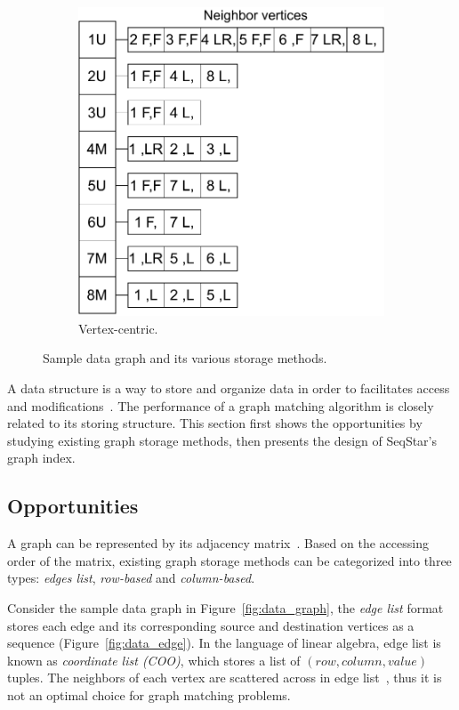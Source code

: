 \begin{figure}
\begin{minipage}[b]{0.68\textwidth}
\begin{subfigure}[b]{0.3\textwidth}
      \includegraphics[scale=0.3]{img/data_vertex_centric}
      \caption{Vertex-centric.}\label{fig:data_vertex_centric}
    \end{subfigure}
  \end{minipage}
  \caption{Sample data graph and its various storage methods.}\label{img:data}
\end{figure}
A data structure is a way to store and organize data in order to facilitates access and modifications~\cite{DBLP:books/daglib/0023376}.
The performance of a graph matching algorithm is closely related to its storing structure.
This section first shows the opportunities by studying existing graph storage methods,
then presents the design of SeqStar's graph index.

\subsection{Opportunities}
A graph can be represented by its adjacency matrix~\cite{DBLP:books/sp/BondyM08}.
Based on the accessing order of the matrix, existing graph storage methods can be categorized into three types:
\emph{edges list}, \emph{row-based} and \emph{column-based}.

Consider the sample data graph in Figure~\ref{fig:data_graph}, the \emph{edge list} format stores each edge and its corresponding source and destination vertices as a sequence (Figure~\ref{fig:data_edge}).
In the language of linear algebra, edge list is known as \emph{coordinate list (COO)}, which stores a list of $(row, column, value)$ tuples.
The neighbors of each vertex are scattered across in edge list~\cite{DBLP:conf/fast/KumarH19}, thus it is not an optimal choice for graph matching problems.

